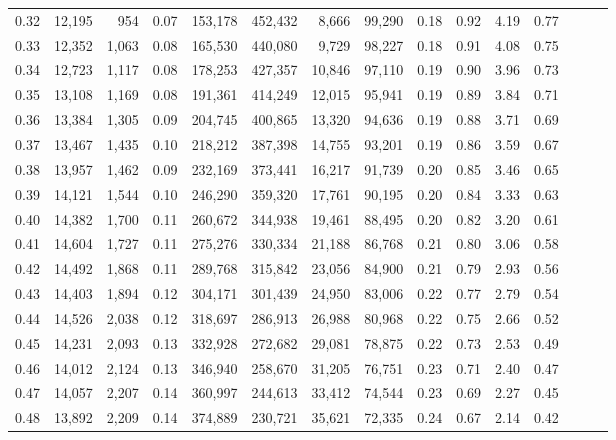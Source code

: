 \begin{tabular}{rrrrrrrrrrrrrrr}
0.32 &  12,195 &    954 &  0.07 &  153,178 &  452,432 &    8,666 &   99,290 &  0.18 &  0.92 &  4.19 &      0.77 \\
0.33 &  12,352 &  1,063 &  0.08 &  165,530 &  440,080 &    9,729 &   98,227 &  0.18 &  0.91 &  4.08 &      0.75 \\
0.34 &  12,723 &  1,117 &  0.08 &  178,253 &  427,357 &   10,846 &   97,110 &  0.19 &  0.90 &  3.96 &      0.73 \\
0.35 &  13,108 &  1,169 &  0.08 &  191,361 &  414,249 &   12,015 &   95,941 &  0.19 &  0.89 &  3.84 &      0.71 \\
0.36 &  13,384 &  1,305 &  0.09 &  204,745 &  400,865 &   13,320 &   94,636 &  0.19 &  0.88 &  3.71 &      0.69 \\
0.37 &  13,467 &  1,435 &  0.10 &  218,212 &  387,398 &   14,755 &   93,201 &  0.19 &  0.86 &  3.59 &      0.67 \\
0.38 &  13,957 &  1,462 &  0.09 &  232,169 &  373,441 &   16,217 &   91,739 &  0.20 &  0.85 &  3.46 &      0.65 \\
0.39 &  14,121 &  1,544 &  0.10 &  246,290 &  359,320 &   17,761 &   90,195 &  0.20 &  0.84 &  3.33 &      0.63 \\
0.40 &  14,382 &  1,700 &  0.11 &  260,672 &  344,938 &   19,461 &   88,495 &  0.20 &  0.82 &  3.20 &      0.61 \\
0.41 &  14,604 &  1,727 &  0.11 &  275,276 &  330,334 &   21,188 &   86,768 &  0.21 &  0.80 &  3.06 &      0.58 \\
0.42 &  14,492 &  1,868 &  0.11 &  289,768 &  315,842 &   23,056 &   84,900 &  0.21 &  0.79 &  2.93 &      0.56 \\
0.43 &  14,403 &  1,894 &  0.12 &  304,171 &  301,439 &   24,950 &   83,006 &  0.22 &  0.77 &  2.79 &      0.54 \\
0.44 &  14,526 &  2,038 &  0.12 &  318,697 &  286,913 &   26,988 &   80,968 &  0.22 &  0.75 &  2.66 &      0.52 \\
0.45 &  14,231 &  2,093 &  0.13 &  332,928 &  272,682 &   29,081 &   78,875 &  0.22 &  0.73 &  2.53 &      0.49 \\
0.46 &  14,012 &  2,124 &  0.13 &  346,940 &  258,670 &   31,205 &   76,751 &  0.23 &  0.71 &  2.40 &      0.47 \\
0.47 &  14,057 &  2,207 &  0.14 &  360,997 &  244,613 &   33,412 &   74,544 &  0.23 &  0.69 &  2.27 &      0.45 \\
0.48 &  13,892 &  2,209 &  0.14 &  374,889 &  230,721 &   35,621 &   72,335 &  0.24 &  0.67 &  2.14 &      0.42 \\

\end{tabular}

